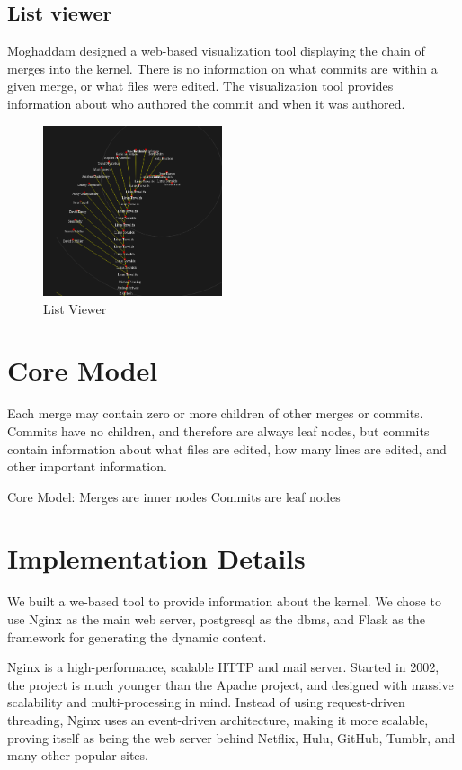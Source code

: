 \documentclass[conference, draftclsnofoot]{IEEEtran}
\begin{document}
\subsection{List viewer}
Moghaddam designed a web-based visualization tool displaying the chain of
merges into the kernel. There is no information on what commits are within a
given merge, or what files were edited. The visualization tool provides
information about who authored the commit and when it was authored.

\begin{figure}[h!]
	\centering
	\includegraphics[width=0.47\textwidth]{figures/gitvis.png}
	\caption{List Viewer}
	\label{fig:listviewer}
\end{figure}


\section{Core Model}
Each merge may contain zero or more children of other merges or commits.
Commits have no children, and therefore are always leaf nodes, but commits
contain information about what files are edited, how many lines are edited, and
other important information.

Core Model:
	Merges are inner nodes
	Commits are leaf nodes

\section{Implementation Details}

We built a we-based tool to provide information about the kernel.
We chose to use Nginx as the main web server, postgresql as the dbms, and Flask
as the framework for generating the dynamic content.

Nginx is a high-performance, scalable HTTP and mail server. Started in 2002,
the project is much younger than the Apache project, and designed with massive
scalability and multi-processing in mind. Instead of using request-driven
threading, Nginx uses an event-driven architecture, making it more scalable,
proving itself as being the web server behind Netflix, Hulu, GitHub, Tumblr,
and many other popular sites.
\end{document}
